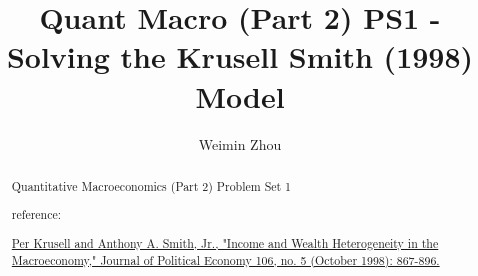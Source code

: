 \documentclass{article}[a4paper]
\title{Quant Macro (Part 2)  PS1 - Solving the Krusell Smith (1998) Model}
\author{Weimin Zhou}
\begin{document}
\maketitle
\begin{abstract}
	Quantitative Macroeconomics (Part 2) Problem Set 1

	reference:

	\href{https://www.journals.uchicago.edu/doi/citedby/10.1086/250034}{Per Krusell and Anthony A. Smith, Jr., "Income and Wealth Heterogeneity in the Macroeconomy," Journal of Political Economy 106, no. 5 (October 1998): 867-896. }
\end{abstract}

\tableofcontents

\pagebreak 


\end{document}
